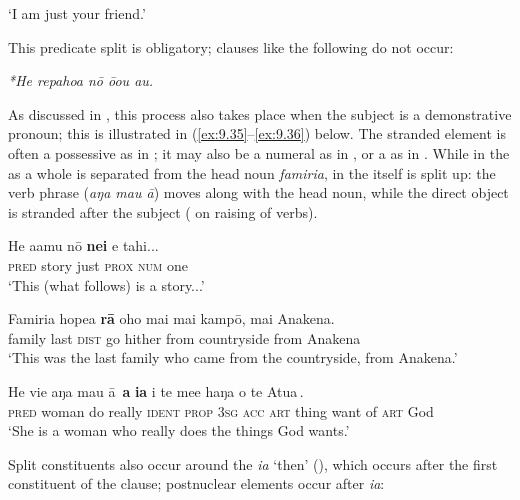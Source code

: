 \glt
‘I am just your friend.’ \textstyleExampleref{[R308.032]} 
\z

This predicate split is obligatory; clauses like the following do not occur:

\ea\label{ex:9.34}
\textit{*He repahoa nō ō{\ꞌ}ou au.}
\z

As discussed in , this process also takes place when the subject is a demonstrative pronoun; this is illustrated in (\ref{ex:9.35}–\ref{ex:9.36}) below. The stranded element is often a possessive as in ; it may also be a numeral as in , or a  as in . While in  the  as a whole is separated from the head noun \textit{famiria}, in  the  itself is split up: the verb phrase (\textit{aŋa mau {\ꞌ}ā}) moves along with the head noun, while the direct object is stranded after the subject ( on raising of  verbs). 

\ea\label{ex:9.35}
\gll He {\ꞌ}a{\ꞌ}amu nō \textbf{nei} e tahi...\\
\textsc{pred} story just \textsc{prox} \textsc{num} one\\

\glt 
‘This (what follows) is a story...’ \textstyleExampleref{[Luke 11:5]}
\z

\ea\label{ex:9.36}
\gll Famiria hope{\ꞌ}a \textbf{rā} oho mai mai kampō, mai {\ꞌ}Anakena. \\
family last \textsc{dist} go hither from countryside from Anakena \\

\glt 
‘This was the last family who came from the countryside, from Anakena.’ \textstyleExampleref{[R413.889]} 
\z

\ea\label{ex:9.37}
\gll He vi{\ꞌ}e {\ob}aŋa mau {\ꞌ}ā\,{\cb} \textbf{a} \textbf{ia} {\ob}i te me{\ꞌ}e haŋa o te {\ꞌ}Atua\,{\cb}. \\
\textsc{pred} woman {\db}do really \textsc{ident} \textsc{prop} \textsc{3sg} {\db}\textsc{acc} \textsc{art} thing want of \textsc{art} God \\

\glt
‘She is a woman who really does the things God wants.’ \textstyleExampleref{[1 Tim. 5:10]}
\z

Split constituents also occur around the  \textit{ia} ‘then’ (), which occurs after the first constituent of the clause; postnuclear elements occur after \textit{ia}:

